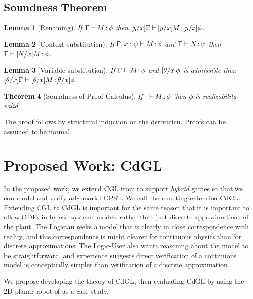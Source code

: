 \documentclass[12pt]{cmuthesis}
\newtheorem{theorem}{Theorem}
\newtheorem{lemma}[theorem]{Lemma}
\theoremstyle{definition}
\theoremstyle{remark}
\newcommand{\rref}[2][]{\prettyref{#2}}
\newcommand{\CGL}{\textsf{CGL}\xspace}
\newcommand{\CdGL}{\textsf{CdGL}\xspace}
\newcommand{\G}{\Gamma}
\begin{document}
\section{Soundness Theorem}
\begin{lemma}[Renaming]
  If $\proves{\G}{M}{\phi}$ then $\proves{\esub{\G}{x}{y}}{\esub{M}{x}{y}}{\esub{\phi}{x}{y}}$.
\end{lemma}
\begin{lemma}[Context substitution]
  If $\proves{\G,x:\psi}{M}{\phi}$ and $\proves{\G}{N}{\psi}$ then $\proves{\G}{\esub{M}{x}{N}}{\phi}$.
\end{lemma}
\begin{lemma}[Variable substitution]
  If $\proves{\G}{M}{\phi}$ and $[{\theta}/{x}]{\phi}$ is admissible then $\proves{\esub{\G}{x}{\theta}}{\esub{M}{x}{\theta}}{\esub{\phi}{x}{\theta}}$.
\end{lemma}
\begin{theorem}[Soundness of Proof Calculus]
  If $\cdot\allowbreak\vdash M \allowbreak \mathop{:} \phi$ then $\phi$ is realizability-valid.
\end{theorem}
The proof follows by structural induction on the derivation.
Proofs can be assumed to be normal.

\chapter{Proposed Work: \CdGL}
\label{sec:cdgl}
In the proposed work, we extend \CGL from \rref{ch:cgl} to support \emph{hybrid} games so that we can model and verify adversarial CPS's.
We call the resulting extension \CdGL.
Extending \CGL to \CdGL is important for the same reason that it is important to allow ODEs in hybrid systems models rather than just discrete approximations of the plant.
The Logician seeks a model that is clearly in close correspondence with reality, and this correspondence is might clearer for continuous physics than for discrete approximations.
The Logic-User also wants reasoning about the model to be straightforward, and experience suggests direct verification of a continuous model is conceptually simpler than verification of a discrete approximation.

We propose developing the theory of \CdGL, then evaluating \CdGL by using the 2D planar robot of \rref{sec:ground-robotics} as a case study.
\end{document}
